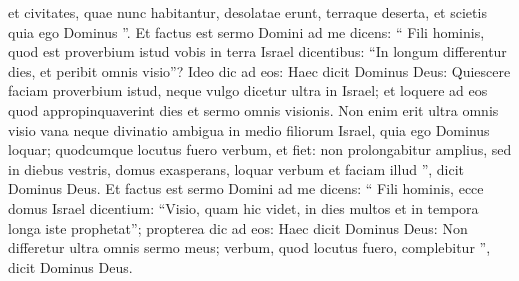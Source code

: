 \begin{biblechapter}
\begin{biblechapter}
\begin{biblechapter}
\begin{biblechapter}
\begin{biblechapter}
\begin{biblechapter}
\begin{biblechapter}
\begin{biblechapter}
\begin{biblechapter}
\begin{biblechapter}
\begin{biblechapter}
\begin{biblechapter}
\verse et civitates, quae nunc habitantur, desolatae erunt, terraque deserta, et scietis quia ego Dominus ”.
 \verse Et factus est sermo Domini ad me dicens: 
\verse “ Fili hominis, quod est proverbium istud vobis in terra Israel dicentibus: “In longum differentur dies, et peribit omnis visio”? 
\verse Ideo dic ad eos: Haec dicit Dominus Deus: Quiescere faciam proverbium istud, neque vulgo dicetur ultra in Israel; et loquere ad eos quod appropinquaverint dies et sermo omnis visionis. 
\verse Non enim erit ultra omnis visio vana neque divinatio ambigua in medio filiorum Israel, 
\verse quia ego Dominus loquar; quodcumque locutus fuero verbum, et fiet: non prolongabitur amplius, sed in diebus vestris, domus exasperans, loquar verbum et faciam illud ”, dicit Dominus Deus.
 \verse Et factus est sermo Domini ad me dicens: 
\verse “ Fili hominis, ecce domus Israel dicentium: “Visio, quam hic videt, in dies multos et in tempora longa iste prophetat”; 
\verse propterea dic ad eos: Haec dicit Dominus Deus: Non differetur ultra omnis sermo meus; verbum, quod locutus fuero, complebitur ”, dicit Dominus Deus.
 

\end{biblechapter}
\end{biblechapter}
\end{biblechapter}
\end{biblechapter}
\end{biblechapter}
\end{biblechapter}
\end{biblechapter}
\end{biblechapter}
\end{biblechapter}
\end{biblechapter}
\end{biblechapter}
\end{biblechapter}
